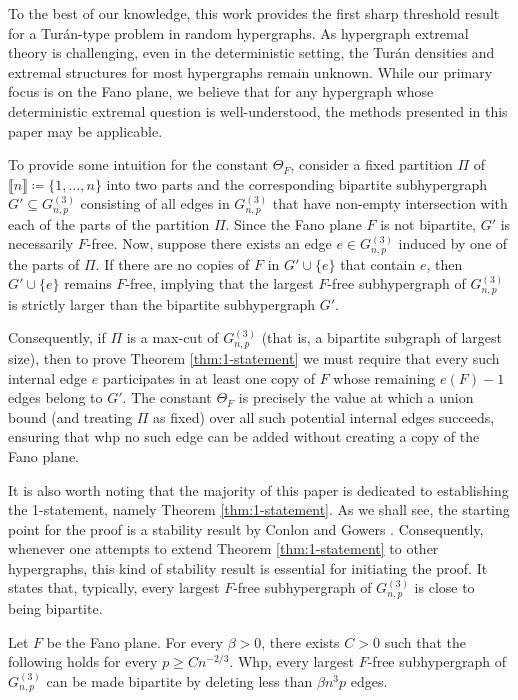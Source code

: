 \documentclass[11pt,a4paper,oneside,reqno]{amsart}
\newcommand{\Gnp}{G_{n, p}^{(3)}}
\newcommand{\1}{\mathbbm{1}} %
\newcommand{\br}[1]{\llbracket{#1}\rrbracket}
\renewcommand{\ge}{\geqslant}
\begin{document}
To the best of our knowledge, this work provides the first sharp threshold result for a Turán-type problem in random hypergraphs. As hypergraph extremal theory is challenging, even in the deterministic setting, the Turán densities and extremal structures for most hypergraphs remain unknown. While our primary focus is on the Fano plane, we believe that for any hypergraph whose deterministic extremal question is well-understood, the methods presented in this paper may be applicable. 

To provide some intuition for the constant $\Theta_F$, consider a fixed partition $\Pi$ of $\br{n} \coloneqq \{1, \dots, n\}$ into two parts and the corresponding bipartite subhypergraph $G' \subseteq G_{n,p}^{(3)}$ consisting of all edges in $G_{n,p}^{(3)}$ that have non-empty intersection with each of the parts of the partition $\Pi$. Since the Fano plane $F$ is not bipartite, $G'$ is necessarily $F$-free. Now, suppose there exists an edge $e \in G_{n,p}^{(3)}$ induced by one of the parts of $\Pi$. If there are no copies of $F$ in $G' \cup \{e\}$ that contain $e$, then $G' \cup \{e\}$ remains $F$-free, implying that the largest $F$-free subhypergraph of $G_{n,p}^{(3)}$ is strictly larger than the bipartite subhypergraph $G'$. 

Consequently, if $\Pi$ is a max-cut of $\Gnp$ (that is, a bipartite subgraph of largest size), then to prove Theorem \ref{thm:1-statement} we must require that every such internal edge $e$ participates in at least one copy of $F$ whose remaining $e(F)-1$ edges belong to $G'$. The constant $\Theta_F$ is precisely the value at which a union bound (and treating $\Pi$ as fixed) over all such potential internal edges succeeds, ensuring that whp no such edge can be added without creating a copy of the Fano plane.

It is also worth noting that the majority of this paper is dedicated to establishing the 1-statement, namely Theorem \ref{thm:1-statement}. As we shall see, the starting point for the proof is a stability result by Conlon and Gowers \cite[Theorem 10.24]{MR3548529}. Consequently, whenever one attempts to extend Theorem \ref{thm:1-statement} to other hypergraphs, this kind of stability result is essential for initiating the proof. It states that, typically, every largest $F$-free subhypergraph of $\Gnp$ is close to being bipartite.
\begin{thm}\label{thm:stability}\cite[Theorem 10.24]{MR3548529}
    Let $F$ be the Fano plane. For every $\beta > 0$, there exists $C > 0$ such that the following holds for every $p \ge C n^{-2/3}$. Whp, every largest $F$-free subhypergraph of $\Gnp$ can be made bipartite by deleting less than $\beta n^3 p$ edges.
\end{thm}
\end{document}
